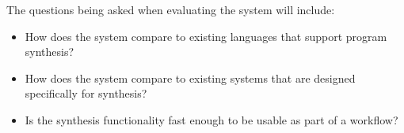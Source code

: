 \documentclass[a4paper]{article}
\begin{document}
The questions being asked when evaluating the system will include: 

\begin{itemize}
\item How does the system compare to existing languages that support program synthesis?
\item How does the system compare to existing systems that are designed specifically for synthesis?
\item Is the synthesis functionality fast enough to be usable as part of a workflow?
\end{itemize}

\clearpage
\nocite{*}

\clearpage
\end{document}
